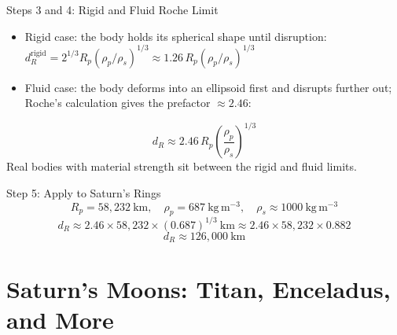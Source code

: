 \documentclass[aspectratio=169, 11pt]{beamer}
\begin{document}
\begin{frame}{Steps 3 and 4: Rigid and Fluid Roche Limit}
  \begin{itemize}
    \item Rigid case: the body holds its spherical shape until disruption: $d_R^{\mathrm{rigid}} = 2^{1/3} R_p (\rho_p/\rho_s)^{1/3} \approx 1.26\, R_p (\rho_p/\rho_s)^{1/3}$
    \item Fluid case: the body deforms into an ellipsoid first and disrupts further out; Roche's calculation gives the prefactor $\approx 2.46$:
  \end{itemize}
  \[
    \boxed{\; d_R \approx 2.46\, R_p \left(\frac{\rho_p}{\rho_s}\right)^{1/3} \;}
  \]
  Real bodies with material strength sit between the rigid and fluid limits.
\end{frame}

\begin{frame}
\end{frame}

\begin{frame}{Step 5: Apply to Saturn's Rings}
  \[
    R_p = 58{,}232~\mathrm{km}, \quad \rho_p = 687~\mathrm{kg\,m^{-3}}, \quad \rho_s \approx 1000~\mathrm{kg\,m^{-3}}
  \]
  \[
    d_R \approx 2.46 \times 58{,}232 \times (0.687)^{1/3}~\mathrm{km}
        \approx 2.46 \times 58{,}232 \times 0.882
  \]
  \[
    \boxed{\; d_R \approx 126{,}000~\mathrm{km} \;}
  \]
  \vskip6pt
\end{frame}


\breakslide


\section{Saturn's Moons: Titan, Enceladus, and More}
\end{document}
